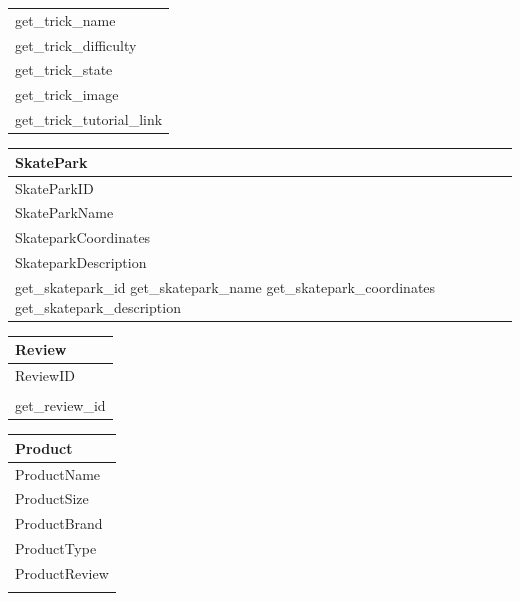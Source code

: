 {{{\begin{center}
\begin{tabular}{|p{5cm}|}
get\_trick\_name \\
get\_trick\_difficulty \\
get\_trick\_state \\
get\_trick\_image \\
get\_trick\_tutorial\_link
\\ \hline 
\end{tabular}
\label{tab:Trick Class Definition}
\end{center}

\begin{center}
\begin{tabular}{|p{5cm}|}
    \hline
 \textbf{SkatePark} \\ \hline
SkateParkID \\
SkateParkName \\
SkateparkCoordinates\\
SkateparkDescription 
\\ \hline 

get\_skatepark\_id
get\_skatepark\_name
get\_skatepark\_coordinates
get\_skatepark\_description
\\ \hline

\end{tabular}
\label{tab:Skate Park Class Definition}
\end{center}

\begin{center}
\begin{tabular}{|p{5cm}|}
    \hline
 \textbf{Review} \\ \hline
ReviewID\\

\\ \hline 

get\_review\_id \\

\hline

\end{tabular}
\label{tab:Review Class Definition}
\end{center}

\begin{center}
\begin{tabular}{|p{5cm}|}
    \hline
 \textbf{Product} \\ \hline
ProductName \\
ProductSize\\
ProductBrand \\
ProductType \\
ProductReview \\
\\ \hline 


\end{tabular}
\end{center}}}}
